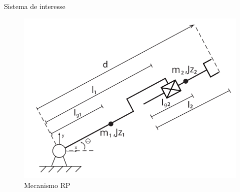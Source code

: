 \documentclass[25pt,landscape]{beamer}
\begin{document}
\begin{frame}
    \titlepage
\end{frame}






\begin{frame}{Sistema de interesse}
    \begin{figure}[H]
		\centering
		\includegraphics[scale=0.5]{FIGURES/RP.pdf}  
		\caption{Mecanismo RP}
		\label{fig:1}
	\end{figure}
\end{frame}
\end{document}
